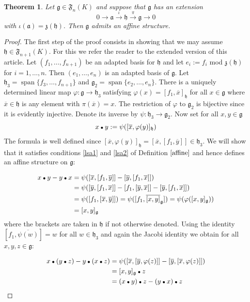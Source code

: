 \documentclass[12pt]{amsart}
\newtheorem{thm}{Theorem}[section]
\theoremstyle{definition}
\theoremstyle{remark}
\DeclareMathOperator{\s}{span}
\newcommand{\pkt}{\mathbin{\raise0pt\hbox{$\scriptstyle\bullet$}}}
\newcommand{\La}{\mathfrak{a}}
\newcommand{\Lg}{\mathfrak{g}}
\newcommand{\Lh}{\mathfrak{h}}
\newcommand{\Lz}{\mathfrak{z}}
\newcommand{\LF}{\mathfrak{F}}
\newcommand{\ov}{\overline}
\newcommand{\ra}{\rightarrow}
\renewcommand{\phi}{\varphi}
\begin{document}
\begin{thm} \label{ext}
Let $\Lg\in\LF_n(K)$ and suppose that $\Lg$
has an extension
\begin{equation*}
0 \rightarrow \La \xrightarrow{\iota} \Lh \xrightarrow{\pi}
\Lg \rightarrow 0
\end{equation*}
with $\iota(\La)=\Lz(\Lh)$. Then $\Lg$ admits an affine structure.
\end{thm}  

\begin{proof}
The first step of the proof consists in showing that
we may assume $\Lh\in \LF_{n+1}(K)$. For this we
refer the reader to the extended version of this article.
Let $(f_1,\dots ,f_{n+1})$ be an adapted basis for $\Lh$ and let
$e_i:=f_i$ mod $\Lz (\Lh)$ for $i=1,\dots, n$.
Then $(e_1,\dots ,e_n)$ is an adapted basis of $\Lg$. Let
$\Lh_3=\s \{f_3,\ldots ,f_{n+1}\}$ and $\Lg_2=\s \{e_2,\ldots ,e_{n}\}$.
There is a uniquely determined linear map $\phi : \Lg \ra \Lh_3$
satisfying $\phi (x)=[f_1,\ov{x}]_{\Lh}$ for all $x\in \Lg$ where
$\ov{x}\in \Lh$ is any element with $\pi (\ov{x})=x$. The restriction
of $\phi$ to $\Lg_2$ is bijective since it is evidently injective. Denote
its inverse by $\psi : \Lh_3 \ra \Lg_2$. Now set for all $x,y\in \Lg$    
\begin{equation}
\label{lsa}
x\pkt y:=\psi ([\ov{x},\phi (y)]_{\Lh})
\end{equation}
The formula is well defined since $[\ov{x},\phi (y)]_{\Lh}
=[\ov{x},[f_1,\ov{y}]]\in \Lh_3$.
We will show that it satisfies conditions \eqref{lsa1} and \eqref{lsa2} of
Definition $\ref{affine}$ and hence defines an affine structure on $\Lg$:

\begin{align*}
x\pkt y-y\pkt x & = \psi([\ov{x},[f_1,\ov{y}]]-[\ov{y},[f_1,\ov{x}]]) \\
 & = \psi([\ov{y},[f_1,\ov{x}]]-[f_1,[\ov{y},\ov{x}]] -[\ov{y},
[f_1,\ov{x}]]) \\
 & = \psi([f_1,[\ov{x},\ov{y}]])=\psi([f_1,\ov{[x,y]}_{\Lg}])
     =\psi(\phi([x,y]_{\Lg})) \\
 & = [x,y]_{\Lg}
\end{align*}
where the brackets are taken in $\Lh$ if not otherwise denoted.
Using the identity $[f_1,\ov{\psi(w)}]=w$ for all $w\in \Lh_3$
and again the Jacobi identity we obtain for all $x,y,z\in \Lg$:

\begin{align*}
x\pkt (y\pkt z)-y\pkt (x\pkt z) & = \psi ([\ov{x},[\ov{y},\phi(z)]]-
[\ov{y},[\ov{x},\phi(z)]]) \\
 & = [x,y]_{\Lg}\pkt z \\
 & = (x\pkt y) \pkt z-(y\pkt x)\pkt z
\end{align*}

\end{proof}    
\end{document}
